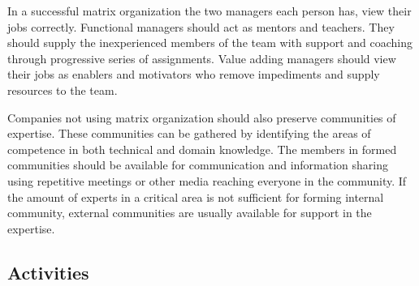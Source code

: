 In a successful matrix organization the two managers each person has, view their jobs correctly. Functional managers should act as mentors and teachers. They should supply the inexperienced members of the team with support and coaching through progressive series of assignments. Value adding managers should view their jobs as enablers and motivators who remove impediments and supply resources to the team.

Companies not using matrix organization should also preserve communities of expertise. These communities can be gathered by identifying the areas of competence in both technical and domain knowledge. The members in formed communities should be available for communication and information sharing using repetitive meetings or other media reaching everyone in the community. If the amount of experts in a critical area is not sufficient for forming internal community, external communities are usually available for support in the expertise.



\subsection{Activities}


